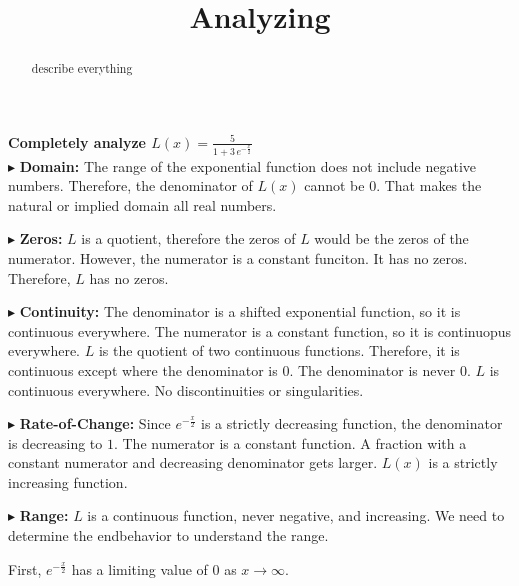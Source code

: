 \documentclass{ximera}
\title{Analyzing}
\begin{document}
\begin{abstract}
describe everything
\end{abstract}
\maketitle







\textbf{Completely analyze $L(x) = \frac{5}{1 + 3 \, e^{-\tfrac{x}{2}}}$} \\






$\blacktriangleright$  \textbf{Domain:} The range of the exponential function does not include negative numbers. Therefore, the denominator of $L(x)$ cannot be $0$.  That makes the natural or implied domain all real numbers.


$\blacktriangleright$ \textbf{Zeros:} $L$ is a quotient, therefore the zeros of $L$ would be the zeros of the numerator.  However, the numerator is a constant funciton.  It has no zeros. Therefore, $L$ has no zeros.



$\blacktriangleright$ \textbf{Continuity:} The denominator is a shifted exponential function, so it is continuous everywhere. The numerator is a constant function, so it is continuopus everywhere.  $L$ is the quotient of two continuous functions.  Therefore, it is continuous except where the denominator is $0$.  The denominator is never $0$. $L$ is continuous everywhere.  No discontinuities or singularities.








$\blacktriangleright$ \textbf{Rate-of-Change:}    Since $e^{-\tfrac{x}{2}}$ is a strictly decreasing function, the denominator is decreasing to $1$. The numerator is a constant function. A fraction with a constant numerator and decreasing denominator gets larger. $L(x)$ is a strictly increasing function.






$\blacktriangleright$ \textbf{Range:} $L$ is a continuous function, never negative, and increasing. We need to determine the endbehavior to understand the range.


First, $e^{-\tfrac{x}{2}}$ has a limiting value of $0$ as $x \to \infty$.
\end{document}
